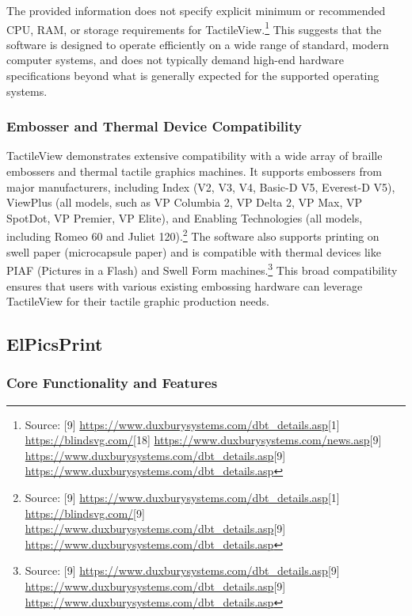 The provided information does not specify explicit minimum or recommended CPU, RAM, or storage requirements for TactileView.\footnote{Source: [9] \url{https://www.duxburysystems.com/dbt_details.asp}[1] \url{https://blindsvg.com/}[18] \url{https://www.duxburysystems.com/news.asp}[9] \url{https://www.duxburysystems.com/dbt_details.asp}[9] \url{https://www.duxburysystems.com/dbt_details.asp}} This suggests that the software is designed to operate efficiently on a wide range of standard, modern computer systems, and does not typically demand high-end hardware specifications beyond what is generally expected for the supported operating systems.

\subsubsection{Embosser and Thermal Device Compatibility}

TactileView demonstrates extensive compatibility with a wide array of braille embossers and thermal tactile graphics machines. It supports embossers from major manufacturers, including Index (V2, V3, V4, Basic-D V5, Everest-D V5), ViewPlus (all models, such as VP Columbia 2, VP Delta 2, VP Max, VP SpotDot, VP Premier, VP Elite), and Enabling Technologies (all models, including Romeo 60 and Juliet 120).\footnote{Source: [9] \url{https://www.duxburysystems.com/dbt_details.asp}[1] \url{https://blindsvg.com/}[9] \url{https://www.duxburysystems.com/dbt_details.asp}[9] \url{https://www.duxburysystems.com/dbt_details.asp}} The software also supports printing on swell paper (microcapsule paper) and is compatible with thermal devices like PIAF (Pictures in a Flash) and Swell Form machines.\footnote{Source: [9] \url{https://www.duxburysystems.com/dbt_details.asp}[9] \url{https://www.duxburysystems.com/dbt_details.asp}[9] \url{https://www.duxburysystems.com/dbt_details.asp}} This broad compatibility ensures that users with various existing embossing hardware can leverage TactileView for their tactile graphic production needs.

\subsection{ElPicsPrint}

\subsubsection{Core Functionality and Features}

